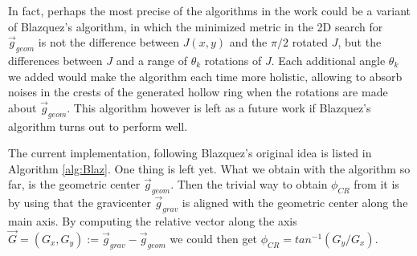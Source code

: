 \documentclass[11pt, a4paper, twoside]{article} %
\begin{document}


In fact, perhaps the most precise of the algorithms in the work could be a variant of Blazquez's algorithm, in which the minimized metric in the 2D search for $\vec{g}_{geom}$ is not the difference between $J(x,y)$ and the $\pi/2$ rotated $J$, but the differences between $J$ and a range of $\theta_k$ rotations of $J$. Each additional angle $\theta_k$ we added would make the algorithm each time more holistic, allowing to absorb noises in the crests of the generated hollow ring when the rotations are made about $\vec{g}_{geom}$. This algorithm however is left as a future work if Blazquez's algorithm turns out to perform well.

The current implementation, following Blazquez's original idea is listed in Algorithm \ref{alg:Blaz}. One thing is left yet. What we obtain with the algorithm so far, is the geometric center $\vec{g}_{geom}$. Then the trivial way to obtain $\phi_{CR}$ from it is by using that the gravicenter $\vec{g}_{grav}$ is aligned with the geometric center along the main axis. By computing the relative vector along the axis $\vec{G}=(G_x,G_y):=\vec{g}_{grav}-\vec{g}_{geom}$ we could then get $\phi_{CR}=tan^{-1}(G_y/G_x)$.\vspace{-0.2cm}
\end{document}
